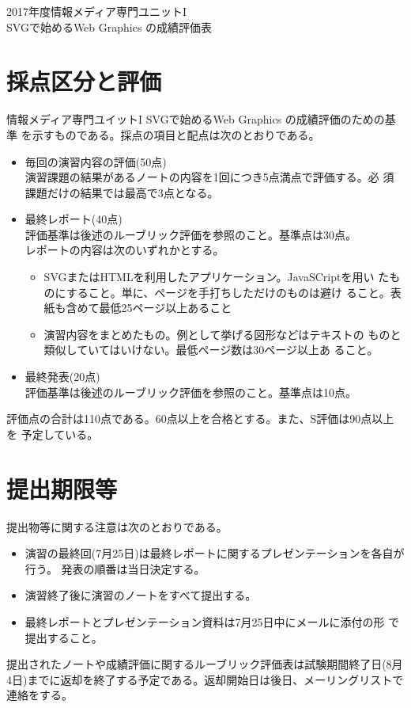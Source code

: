 \documentclass[a4j]{jreport}
\begin{document}
 \begin{center}
  2017年度情報メディア専門ユニットI \\
  {\Large SVGで始めるWeb Graphics の成績評価表}
 \end{center}
 \section{採点区分と評価}
情報メディア専門ユイットI SVGで始めるWeb Graphics の成績評価のための基準
を示すものである。採点の項目と配点は次のとおりである。
\begin{itemize}
 \item 毎回の演習内容の評価(50点)\\
       演習課題の結果があるノートの内容を1回につき5点満点で評価する。必
       須課題だけの結果では最高で3点となる。
 \item 最終レポート(40点)\\
       評価基準は後述のルーブリック評価を参照のこと。基準点は30点。\\
       レポートの内容は次のいずれかとする。
       \begin{itemize}
        \item SVGまたはHTMLを利用したアプリケーション。JavaSCriptを用い
              たものにすること。単に、ページを手打ちしただけのものは避け
              ること。表紙も含めて最低25ページ以上あること
        \item 演習内容をまとめたもの。例として挙げる図形などはテキストの
              ものと類似していてはいけない。最低ページ数は30ページ以上あ
              ること。
       \end{itemize}
 \item 最終発表(20点)\\
       評価基準は後述のルーブリック評価を参照のこと。基準点は10点。       
\end{itemize}
評価点の合計は110点である。60点以上を合格とする。また、S評価は90点以上を
予定している。
\section{提出期限等}
提出物等に関する注意は次のとおりである。
\begin{itemize}
 \item 演習の最終回(7月25日)は最終レポートに関するプレゼンテーションを各自が行う。
       発表の順番は当日決定する。
 \item 演習終了後に演習のノートをすべて提出する。
 \item 最終レポートとプレゼンテーション資料は7月25日中にメールに添付の形
       で提出すること。
\end{itemize}
提出されたノートや成績評価に関するルーブリック評価表は試験期間終了日(8月
4日)までに返却を終了する予定である。返却開始日は後日、メーリングリストで連絡をする。
\end{document}
